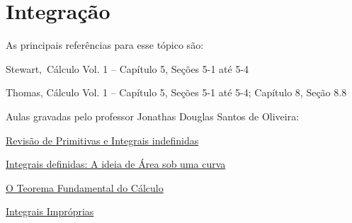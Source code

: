 \section{Integração}

As principais referências para esse tópico são:
\begin{listrefs}
  \item Stewart,\, Cálculo Vol. 1 \cite{stewart_1} -- Capítulo 5, Seções 5-1 até 5-4
  \item Thomas,    Cálculo Vol. 1 \cite{thomas_1}  -- Capítulo 5, Seções 5-1 até 5-4; Capítulo 8, Seção 8.8
\end{listrefs}

Aulas gravadas pelo professor Jonathas Douglas Santos de Oliveira:
\begin{listlinks}
  \item \href{https://youtu.be/8tyJhxZfiSY}{Revisão de Primitivas e Integrais indefinidas}
  \item \href{https://youtu.be/hD18trWiGEs}{Integrais definidas: A ideia de Área sob uma curva}
  \item \href{https://youtu.be/SOW8gYBs98c}{O Teorema Fundamental do Cálculo}
  \item \href{https://youtu.be/tYQ5nwtuFUQ}{Integrais Impróprias}
\end{listlinks}

